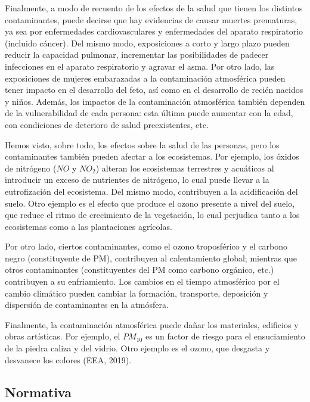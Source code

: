 \documentclass[12pt]{article}
\begin{document}
Finalmente, a modo de recuento de los efectos de la salud que tienen los distintos contaminantes, puede decirse que hay evidencias de causar muertes prematuras, ya sea por enfermedades cardiovasculares y enfermedades del aparato respiratorio (incluido cáncer). Del mismo modo, exposiciones a corto y largo plazo pueden reducir la capacidad pulmonar, incrementar las posibilidades de padecer infecciones en el aparato respiratorio y agravar el asma. Por otro lado, las exposiciones de mujeres embarazadas a la contaminación atmosférica pueden	 tener impacto en el desarrollo del feto, así como en el desarrollo de recién nacidos y niños. Además, los impactos de la contaminación atmosférica también dependen de la vulnerabilidad de cada persona: esta última puede aumentar con la edad, con condiciones de deterioro de salud preexistentes, etc.

Hemos visto, sobre todo, los efectos sobre la salud de las personas, pero los contaminantes también pueden afectar a los ecosistemas. Por ejemplo, los óxidos de nitrógeno ($NO$ y $NO_2$) alteran los ecosistemas terrestres y acuáticos al introducir un exceso de nutrientes de nitrógeno, lo cual puede llevar a la eutrofización del ecosistema. Del mismo modo, contribuyen a la acidificación del suelo. Otro ejemplo es el efecto que produce el ozono presente a nivel del suelo, que reduce el ritmo de crecimiento de la vegetación, lo cual perjudica tanto a los ecosistemas como a las plantaciones agrícolas.

Por otro lado, ciertos contaminantes, como el ozono troposférico y el carbono negro (constituyente de PM), contribuyen al calentamiento global; mientras que otros contaminantes (constituyentes del PM como carbono orgánico, etc.) contribuyen a su enfriamiento. Los cambios en el tiempo atmosférico por el cambio climático pueden cambiar la formación, transporte, deposición y dispersión de contaminantes en la atmósfera.

Finalmente, la contaminación atmosférica puede dañar los materiales, edificios y obras artísticas. Por ejemplo, el $PM_{10}$ es un factor de riesgo para el ensuciamiento de la piedra caliza y del vidrio. Otro ejemplo es el ozono, que desgasta y desvanece los colores (EEA, 2019).

\subsection{Normativa}
\end{document}
